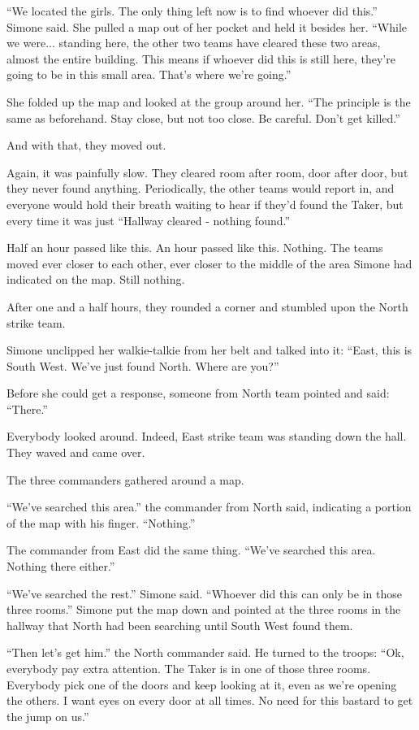 \documentclass[letterpaper,12pt]{report}
\begin{document}
``We located the girls. The only thing left now is to find whoever did this.'' Simone said. She pulled a map out of her pocket and held it besides her. ``While we were... standing here, the other two teams have cleared these two areas, almost the entire building. This means if whoever did this is still here, they're going to be in this small area. That's where we're going.''

She folded up the map and looked at the group around her. ``The principle is the same as beforehand. Stay close, but not too close. Be careful. Don't get killed.''

And with that, they moved out.

Again, it was painfully slow. They cleared room after room, door after door, but they never found anything. Periodically, the other teams would report in, and everyone would hold their breath waiting to hear if they'd found the Taker, but every time it was just ``Hallway cleared - nothing found.''

Half an hour passed like this. An hour passed like this. Nothing. The teams moved ever closer to each other, ever closer to the middle of the area Simone had indicated on the map. Still nothing.

After one and a half hours, they rounded a corner and stumbled upon the North strike team.

Simone unclipped her walkie-talkie from her belt and talked into it: ``East, this is South West. We've just found North. Where are you?''

Before she could get a response, someone from North team pointed and said: ``There.''

Everybody looked around. Indeed, East strike team was standing down the hall. They waved and came over.

The three commanders gathered around a map.

``We've searched this area.'' the commander from North said, indicating a portion of the map with his finger. ``Nothing.''

The commander from East did the same thing. ``We've searched this area. Nothing there either.''

``We've searched the rest.'' Simone said. ``Whoever did this can only be in those three rooms.'' Simone put the map down and pointed at the three rooms in the hallway that North had been searching until South West found them.

``Then let's get him.'' the North commander said. He turned to the troops: ``Ok, everybody pay extra attention. The Taker is in one of those three rooms. Everybody pick one of the doors and keep looking at it, even as we're opening the others. I want eyes on every door at all times. No need for this bastard to get the jump on us.''
\end{document}
